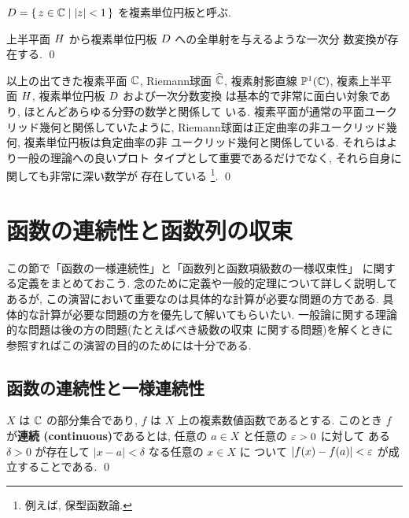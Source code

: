 \documentclass[12pt,twoside]{jarticle}
\begin{document}

$D=\{\,z\in{\mathbb C}\mid |z|<1\,\}$ を複素単位円板と呼ぶ. 

\begin{question}
  上半平面 $H$ から複素単位円板 $D$ への全単射を与えるような一次分
  数変換が存在する. \qed
\end{question}


\begin{guide}
以上の出てきた複素平面 ${\mathbb C}$, Riemann球面 $\widehat{{\mathbb C}}$, 複素射影直線 
${\mathbb P}^1({\mathbb C})$, 複素上半平面 $H$, 複素単位円板 $D$ および一次分数変換
は基本的で非常に面白い対象であり, ほとんどあらゆる分野の数学と関係して
いる. 複素平面が通常の平面ユークリッド幾何と関係していたように,
Riemann球面は正定曲率の非ユークリッド幾何, 複素単位円板は負定曲率の非
ユークリッド幾何と関係している. それらはより一般の理論への良いプロト
タイプとして重要であるだけでなく, それら自身に関しても非常に深い数学が
存在している%
\footnote{例えば, 保型函数論. }. %
\qed
\end{guide}


\section{函数の連続性と函数列の収束}

この節で「函数の一様連続性」と「函数列と函数項級数の一様収束性」
に関する定義をまとめておこう.
念のために定義や一般的定理について詳しく説明してあるが, 
この演習において重要なのは具体的な計算が必要な問題の方である.
具体的な計算が必要な問題の方を優先して解いてもらいたい.
一般論に関する理論的な問題は後の方の問題(たとえばべき級数の収束
に関する問題)を解くときに参照すればこの演習の目的のためには十分である.


\subsection{函数の連続性と一様連続性}

\begin{definition}[連続函数]
 $X$ は ${\mathbb C}$ の部分集合であり, $f$ は $X$ 上の複素数値函数であるとする.
 このとき $f$ が{\bf 連続 (continuous)}であるとは, 
 任意の $a\in X$ と任意の $\varepsilon>0$ に対して
 ある $\delta>0$ が存在して $|x-a|<\delta$ なる任意の $x\in X$ に
 ついて $|f(x)-f(a)|<\varepsilon$ が成立することである.
 \qed
\end{definition}
\end{document}
